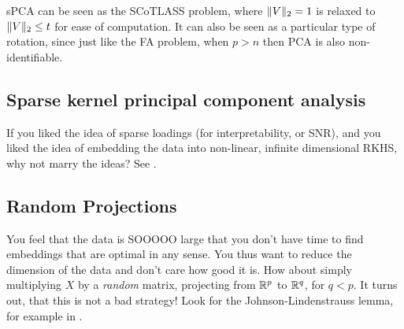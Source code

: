 \documentclass[12pt,a4paper]{article}
\begin{document}
sPCA can be seen as the SCoTLASS problem, where $\Vert V \Vert_2=1$ is relaxed to $ \Vert V \Vert_2\leq t$ for ease of computation.
It can also be seen as a particular type of rotation, since just like the FA problem, when $p>n$ then PCA is also non-identifiable. 





\subsection{Sparse kernel principal component analysis}
If you liked the idea of sparse loadings (for interpretability, or SNR), and you liked the idea of embedding the data into non-linear, infinite dimensional RKHS, why not marry the ideas?
See \citet{tipping2001sparse}.



\subsection{Random Projections}
You feel that the data is SOOOOO large that you don't have time to find embeddings that are optimal in any sense. 
You thus want to reduce the dimension of the data and don't care how good it is. 
How about simply multiplying $X$ by a \emph{random} matrix, projecting from $\mathbb{R}^p$ to $\mathbb{R}^q$, for $q<p$.
It turns out, that this is not a bad strategy!
Look for the Johnson-Lindenstrauss lemma, for example in \citet{mohri2012foundations}.


\newpage


\end{document}
